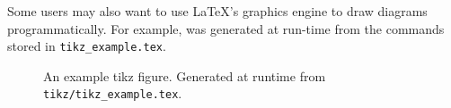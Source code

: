 \begin{figure}[H]
\end{figure}

Some users may also want to use \LaTeX's graphics engine to draw diagrams programmatically. For example,  was generated at run-time from the commands stored in \verb|tikz_example.tex|.

\begin{figure}[H]
\centering

\caption[An example tikz figure]
{
An example tikz figure. Generated at runtime from \texttt{tikz/tikz\_example.tex}.
}
\label{fig:exampleTikz}
\end{figure}

